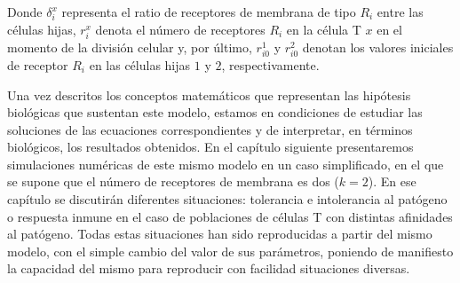 Donde $\delta_{i}^{x}$ representa el ratio de receptores de membrana de tipo $R_{i}$ entre las células hijas, $r_{i}^{x}$ denota el número de receptores $R_{i}$ en la célula T $x$ en el momento de la división celular y, por último, $r_{i0}^{1}$ y $r_{i0}^{2}$ denotan los valores iniciales de receptor $R_{i}$ en las células hijas $1$ y $2$, respectivamente.


Una vez descritos los conceptos matemáticos que representan las hipótesis biológicas que sustentan este modelo, estamos en condiciones de estudiar las soluciones de las ecuaciones correspondientes y de interpretar, en términos biológicos, los resultados obtenidos. En el capítulo siguiente presentaremos simulaciones numéricas de este mismo modelo en un caso simplificado, en el que se supone que el número de receptores de membrana es dos ($k = 2$). En ese capítulo se discutirán diferentes situaciones: tolerancia e intolerancia al patógeno o respuesta inmune en el caso de poblaciones de células T con distintas afinidades al patógeno. Todas estas situaciones han sido reproducidas a partir del mismo modelo, con el simple cambio del valor de sus parámetros, poniendo de manifiesto la capacidad del mismo para reproducir con facilidad situaciones diversas. 


%

